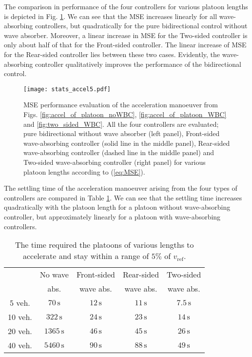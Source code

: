 \documentclass[final,5p,times,twocolumn]{elsarticle}
\begin{document}
The comparison in performance of the four controllers for various platoon lengths is depicted in Fig. \ref{fig:stats_accel}. We can see that the MSE increases linearly for all wave-absorbing controllers, but quadratically for the pure bidirectional control without wave absorber. Moreover, a linear increase in MSE for the Two-sided controller is only about half of that for the Front-sided controller. The linear increase of MSE for the Rear-sided controller lies between these two cases. Evidently, the wave-absorbing controller qualitatively improves the performance of the bidirectional control.
\begin{figure}[ht]
 \centering
  \texttt{[image: stats\_accel5.pdf]}
  \caption{MSE performance evaluation of the acceleration manoeuver from Figs. \ref{fig:accel_of_platoon_noWBC}, \ref{fig:accel_of_platoon_WBC} and \ref{fig:two_sided_WBC}. All the four controllers are evaluated; pure bidirectional without wave absorber (left panel), Front-sided wave-absorbing controller (solid line in the middle panel), Rear-sided wave-absorbing controller (dashed line in the middle panel) and Two-sided wave-absorbing controller (right panel) for various platoon lengths according to (\ref{eq:MSE}).}
  \label{fig:stats_accel}
\end{figure}

The settling time of the acceleration manoeuver arising from the four types of controllers are compared in Table \ref{table_settling_time}. We can see that the settling time increases quadratically with the platoon length for a platoon without wave-absorbing controller, but approximately linearly for a platoon with wave-absorbing controllers.
\begin{table}[!h]
\renewcommand{\arraystretch}{1.1}
\caption{The time required the platoons of various lengths to accelerate and stay within a range of $5\%$ of $v_{\text{ref}}$.}
\label{table_settling_time}
\centering
\small
\begin{tabular}{|c|c|c|c|c|}
\hline
& No wave &  Front-sided & Rear-sided & Two-sided\\
& abs.& wave abs. & wave abs. & wave abs. \\
\hline
 5 veh. & $70\,\text{s}$ & $12\,\text{s}$ & $11\,\text{s}$ & $7.5\,\text{s}$\\
\hline
 10 veh. & $322\,\text{s}$ & $24\,\text{s}$ & $23\,\text{s}$ & $14\,\text{s}$\\
\hline
20 veh. & $1365\,\text{s}$ & $46\,\text{s}$ & $45\,\text{s}$ & $26\,\text{s}$\\
\hline
 40 veh. & $5460\,\text{s}$ & $90\,\text{s}$ &$88\,\text{s}$& $49\,\text{s}$\\
\hline
\end{tabular}
\end{table}
\normalsize
\end{document}
